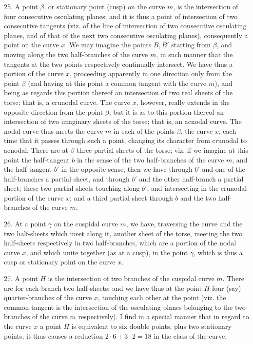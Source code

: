 \documentclass[11pt,a4paper]{article}
\begin{document}
25. A point \(\beta\), or stationary point (cusp) on the curve \(m\), is the intersection
of four consecutive osculating planes; and it is thus a point of intersection of two
consecutive tangents (viz. of the line of intersection of two consecutive osculating
planes, and of that of the next two consecutive osculating planes), consequently a
point on the curve \(x\). We may imagine the points \(B,B'\) starting from \(\beta\),
and moving along the two half-branches of the curve \(m\), in such manner that the
tangents at the two points respectively continually intersect. We have thus a portion
of the curve \(x\), proceeding apparently in one direction only from the point \(\beta\)
(and having at this point a common tangent with the curve \(m\)), and being as
regards this portion thereof an intersection of two real sheets of the torse; that is,
a crunodal curve. The curve \(x\), however, really extends in the opposite direction
from the point \(\beta\), but it is as to this portion thereof an intersection of two
imaginary sheets of the torse; that is, an acnodal curve. The nodal curve thus meets
the curve \(m\) in each of the points \(\beta\), the curve \(x\), each time that it passes
through such a point, changing its character from crunodal to acnodal. There are at
\(\beta\) three partial sheets of the torse; viz. if we imagine at this point the
half-tangent \(b\) in the sense of the two half-branches of the curve \(m\), and the
half-tangent \(b'\) in the opposite sense, then we have through \(b'\) and one of the
half-branches a partial sheet, and through \(b'\) and the other half-branch a partial
sheet; these two partial sheets touching along \(b'\), and intersecting in the crunodal
portion of the curve \(x\); and a third partial sheet through \(b\) and the two
half-branches of the curve \(m\).

26. At a point \(\gamma\) on the cuspidal curve \(m\), we have, traversing the curve and
the two half-sheets which meet along it, another sheet of the torse, meeting the two
half-sheets respectively in two half-branches, which are a portion of the nodal curve
\(x\), and which unite together (as at a cusp), in the point \(\gamma\), which is thus a
cusp or stationary point on the curve \(x\).

27. A point \(H\) is the intersection of two branches of the cuspidal curve \(m\).
There are for each branch two half-sheets; and we have thus at the point \(H\) four
(say) quarter-branches of the curve \(x\), touching each other at the point (viz. the
common tangent is the intersection of the osculating planes belonging to the two
branches of the curve \(m\) respectively). I find in a special manner that in regard to
the curve \(x\) a point \(H\) is equivalent to six double points, plus two stationary
points; it thus causes a reduction \(2\cdot6+3\cdot2=18\) in the class of the curve.
\end{document}
